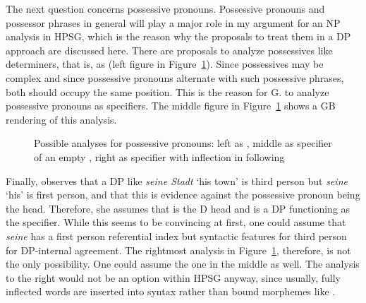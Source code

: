 \documentclass[output=paper
  ,nobabel
  ,draftmode
  ,uniformtopskip %
  ,colorlinks, citecolor=brown
]{langscibook}
\begin{document}
The next question concerns possessive pronouns. Possessive pronouns and possessor phrases in general
will play a major role in my argument for an NP analysis in HPSG, which is the reason why the
proposals to treat them in a DP approach are discussed here. There are proposals to analyze possessives like
determiners, that is, as \dnull (left figure in Figure~\ref{abb-dp-possessiva}). Since possessives may be complex and since possessive pronouns
alternate with such possessive phrases, both should occupy the same position. This is the reason for
G. \citet[]{GMueller2007a} to analyze possessive pronouns as specifiers. The middle figure
in Figure~\ref{abb-dp-possessiva} shows a GB rendering of this analysis.
\begin{figure}
\hfill
{}
\hfill
{}
\hfill
{}
\hfill\mbox{}
\caption{Possible analyses for possessive pronouns: left as \dnull, middle as specifier of an empty
  \dnull, right as specifier with inflection in \dnull following \citet[]{Olsen91b}}\label{abb-dp-possessiva}
\end{figure}
Finally, \citet[]{Olsen91b} observes that a DP like \emph{seine Stadt} `his town' is third person but
\emph{seine} `his' is first person, and that this is evidence against the possessive pronoun being the
head. Therefore, she assumes that  is the D head and  is a DP functioning
as the specifier. While this seems to be convincing at first, one could assume that \emph{seine} has
a first person referential index but syntactic features for third person for DP-internal
agreement. The rightmost analysis in Figure~\ref{abb-dp-possessiva}, therefore, is not the only possibility. One could assume the one in
the middle as well. The analysis to the right would not be an option within HPSG anyway, since
usually, fully inflected words are inserted into syntax rather than bound morphemes like .
\end{document}
